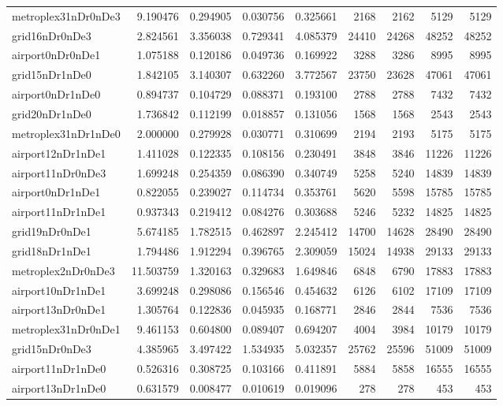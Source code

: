 \begin{longtable}{|l|r|r|r|r|r|r|r|r|}
metroplex31nDr0nDe3 & 9.190476 & 0.294905 & 0.030756 & 0.325661 & 2168 & 2162 & 5129 & 5129 \\
grid16nDr0nDe3 & 2.824561 & 3.356038 & 0.729341 & 4.085379 & 24410 & 24268 & 48252 & 48252 \\
airport0nDr0nDe1 & 1.075188 & 0.120186 & 0.049736 & 0.169922 & 3288 & 3286 & 8995 & 8995 \\
grid15nDr1nDe0 & 1.842105 & 3.140307 & 0.632260 & 3.772567 & 23750 & 23628 & 47061 & 47061 \\
airport0nDr1nDe0 & 0.894737 & 0.104729 & 0.088371 & 0.193100 & 2788 & 2788 & 7432 & 7432 \\
grid20nDr1nDe0 & 1.736842 & 0.112199 & 0.018857 & 0.131056 & 1568 & 1568 & 2543 & 2543 \\
metroplex31nDr1nDe0 & 2.000000 & 0.279928 & 0.030771 & 0.310699 & 2194 & 2193 & 5175 & 5175 \\
airport12nDr1nDe1 & 1.411028 & 0.122335 & 0.108156 & 0.230491 & 3848 & 3846 & 11226 & 11226 \\
airport11nDr0nDe3 & 1.699248 & 0.254359 & 0.086390 & 0.340749 & 5258 & 5240 & 14839 & 14839 \\
airport0nDr1nDe1 & 0.822055 & 0.239027 & 0.114734 & 0.353761 & 5620 & 5598 & 15785 & 15785 \\
airport11nDr1nDe1 & 0.937343 & 0.219412 & 0.084276 & 0.303688 & 5246 & 5232 & 14825 & 14825 \\
grid19nDr0nDe1 & 5.674185 & 1.782515 & 0.462897 & 2.245412 & 14700 & 14628 & 28490 & 28490 \\
grid18nDr1nDe1 & 1.794486 & 1.912294 & 0.396765 & 2.309059 & 15024 & 14938 & 29133 & 29133 \\
metroplex2nDr0nDe3 & 11.503759 & 1.320163 & 0.329683 & 1.649846 & 6848 & 6790 & 17883 & 17883 \\
airport10nDr1nDe1 & 3.699248 & 0.298086 & 0.156546 & 0.454632 & 6126 & 6102 & 17109 & 17109 \\
airport13nDr0nDe1 & 1.305764 & 0.122836 & 0.045935 & 0.168771 & 2846 & 2844 & 7536 & 7536 \\
metroplex31nDr0nDe1 & 9.461153 & 0.604800 & 0.089407 & 0.694207 & 4004 & 3984 & 10179 & 10179 \\
grid15nDr0nDe3 & 4.385965 & 3.497422 & 1.534935 & 5.032357 & 25762 & 25596 & 51009 & 51009 \\
airport11nDr1nDe0 & 0.526316 & 0.308725 & 0.103166 & 0.411891 & 5884 & 5858 & 16555 & 16555 \\
airport13nDr1nDe0 & 0.631579 & 0.008477 & 0.010619 & 0.019096 & 278 & 278 & 453 & 453 \\

\end{longtable}
